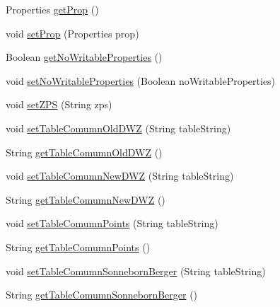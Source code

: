 \begin{DoxyCompactItemize}
Properties \hyperlink{classde_1_1turnierverwaltung_1_1control_1_1_properties_control_ad752b9cccdec58c2ddd2b71fb3ca705b}{get\+Prop} ()
\item 
void \hyperlink{classde_1_1turnierverwaltung_1_1control_1_1_properties_control_a8a579bae7126e1d1cb82c704e876a294}{set\+Prop} (Properties prop)
\item 
Boolean \hyperlink{classde_1_1turnierverwaltung_1_1control_1_1_properties_control_aedb0029a45621448da2d0dd6fcf6e231}{get\+No\+Writable\+Properties} ()
\item 
void \hyperlink{classde_1_1turnierverwaltung_1_1control_1_1_properties_control_a0a2bb5f459717749aa21ca0d70f1bea8}{set\+No\+Writable\+Properties} (Boolean no\+Writable\+Properties)
\item 
void \hyperlink{classde_1_1turnierverwaltung_1_1control_1_1_properties_control_acc971dd6b7e7f008641b38f3304bf8f0}{set\+Z\+PS} (String zps)
\item 
void \hyperlink{classde_1_1turnierverwaltung_1_1control_1_1_properties_control_af3d2c86dcc6d5dfffaddea7aacd1f444}{set\+Table\+Comumn\+Old\+D\+WZ} (String table\+String)
\item 
String \hyperlink{classde_1_1turnierverwaltung_1_1control_1_1_properties_control_ad6d1229e978257a40708bfa91da6f0dc}{get\+Table\+Comumn\+Old\+D\+WZ} ()
\item 
void \hyperlink{classde_1_1turnierverwaltung_1_1control_1_1_properties_control_a6c388883d53630f05e121e1aa97c9eff}{set\+Table\+Comumn\+New\+D\+WZ} (String table\+String)
\item 
String \hyperlink{classde_1_1turnierverwaltung_1_1control_1_1_properties_control_a533b85133265d9c7555d862aca2568eb}{get\+Table\+Comumn\+New\+D\+WZ} ()
\item 
void \hyperlink{classde_1_1turnierverwaltung_1_1control_1_1_properties_control_af40b20f41818715274b46df6ec1d93e1}{set\+Table\+Comumn\+Points} (String table\+String)
\item 
String \hyperlink{classde_1_1turnierverwaltung_1_1control_1_1_properties_control_a80b0cce1376eb7edbd6bb4b63f5c0509}{get\+Table\+Comumn\+Points} ()
\item 
void \hyperlink{classde_1_1turnierverwaltung_1_1control_1_1_properties_control_a8b9bd004a69cf72cd482669e91d6af93}{set\+Table\+Comumn\+Sonneborn\+Berger} (String table\+String)
\item 
String \hyperlink{classde_1_1turnierverwaltung_1_1control_1_1_properties_control_a53300a302c1cacf82963e07ec6f1a367}{get\+Table\+Comumn\+Sonneborn\+Berger} ()
\item 

\end{DoxyCompactItemize}
